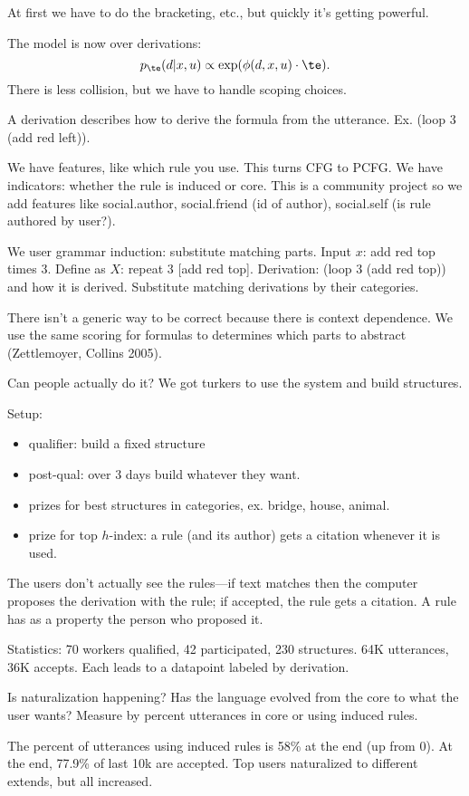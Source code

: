 At first we have to do the bracketing, etc., but quickly it's getting powerful.

The model is now over derivations:
$$
p_\te(d|x,u)\propto \exp(\phi(d,x,u)\cdot \te).
$$
There is less collision, but we have to handle scoping choices.

A derivation describes how to derive the formula from the utterance.  Ex. (loop 3 (add red left)).

We have features, like which rule you use. This turns CFG to PCFG. We have indicators: whether the rule is induced or core. This is a community project so we add features like social.author, social.friend (id of author), social.self (is rule authored by user?).

We user grammar induction: substitute matching parts. Input $x$: add red top times 3. Define as $X$: repeat 3 [add red top]. Derivation: (loop 3 (add red top)) and how it is derived. 
Substitute matching derivations by their categories.

There isn't a generic way to be correct because there is context dependence. We use the same scoring for formulas to determines which parts to abstract (Zettlemoyer, Collins 2005). %

Can people actually do it?  We got turkers to use the system and build structures.

Setup: 
\begin{itemize}
\item
qualifier: build a fixed structure
\item
post-qual: over 3 days build whatever they want.
\item
prizes for best structures in categories, ex. bridge, house, animal.
\item
prize for top $h$-index: a rule (and its author) gets a citation whenever it is used.
\end{itemize}
The users don't actually see the rules---if text matches then the computer proposes the derivation with the rule; if accepted, the rule gets a citation.
A rule has as a property the person who proposed it.

Statistics: 70 workers qualified, 42 participated, 230 structures. 64K utterances, 36K accepts. Each leads to a datapoint labeled by derivation.

Is naturalization happening? Has the language evolved from the core to what the user wants? Measure by percent utterances in core or using induced rules. 

The percent of utterances using induced rules is 58\% at the end (up from 0). At the end, 77.9\% of last 10k are accepted.  Top users naturalized to different extends, but all increased.

